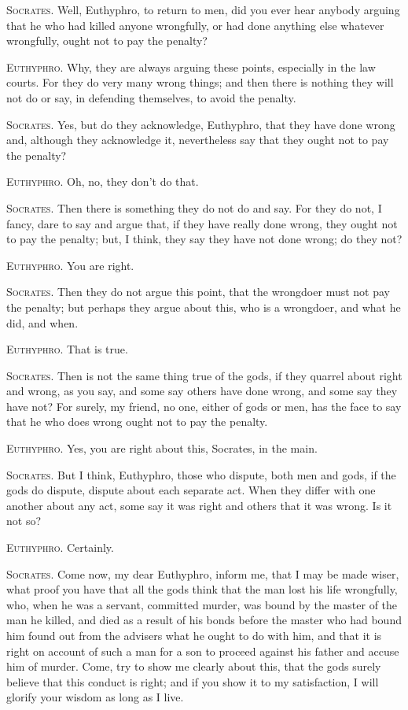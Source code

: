 \textsc{Socrates}. Well, Euthyphro, to return to men, did you ever
hear anybody arguing that he who had killed anyone wrongfully, or had
done anything else whatever wrongfully, ought not to pay the penalty?

\textsc{Euthyphro}. Why, they are always arguing these points,
especially in the law courts. For they do very many wrong things; and
then there is nothing they will not do or say, in defending
themselves, to avoid the penalty.

\textsc{Socrates}. Yes, but do they acknowledge, Euthyphro, that they
have done wrong and, although they acknowledge it, nevertheless say
that they ought not to pay the penalty?

\textsc{Euthyphro}. Oh, no, they don't do that.

\textsc{Socrates}. Then there is something they do not do and
say. For they do not, I fancy, dare to say and argue that, if they
have really done wrong, they ought not to pay the penalty; but, I
think, they say they have not done wrong; do they not?

\textsc{Euthyphro}. You are right.

\textsc{Socrates}. Then they do not argue this point, that the
wrongdoer must not pay the penalty; but perhaps they argue about this,
who is a wrongdoer, and what he did, and when.

\textsc{Euthyphro}. That is true.

\textsc{Socrates}. Then is not the same thing true of the gods, if
they quarrel about right and wrong, as you say, and some say others
have done wrong, and some say they have not? For surely, my friend, no
one, either of gods or men, has the face to say that he who does wrong
ought not to pay the penalty.

\textsc{Euthyphro}. Yes, you are right about this, Socrates, in the
main.

\textsc{Socrates}. But I think, Euthyphro, those who dispute, both men
and gods, if the gods do dispute, dispute about each separate act.
When they differ with one another about any act, some say it was right
and others that it was wrong. Is it not so?

\textsc{Euthyphro}. Certainly.

\textsc{Socrates}. Come now, my dear Euthyphro, inform me, that I may
be made wiser, what proof you have that all the gods think that the
man lost his life wrongfully, who, when he was a servant, committed
 murder, was bound by the master of the man he killed, and
died as a result of his bonds before the master who had bound him
found out from the advisers what he ought to do with him, and that it
is right on account of such a man for a son to proceed against his
father and accuse him of murder. Come, try to show me clearly about
this, that the gods surely believe that this conduct is right; and if
you show it to my satisfaction, I will glorify your wisdom as long as
I live.

